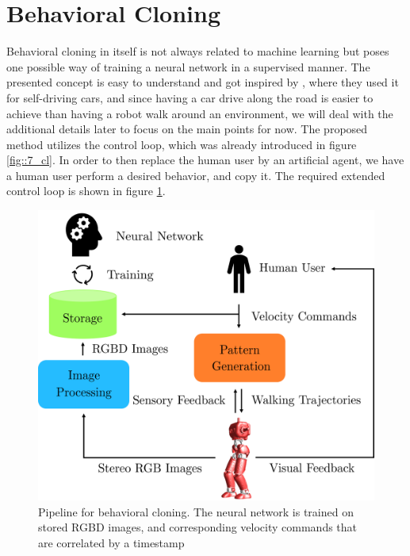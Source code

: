 
\FloatBarrier
\section{Behavioral Cloning}
\label{sec::71_bc}
Behavioral cloning in itself is not always related to machine learning but poses one possible way of training a neural network in a supervised manner. The presented concept is easy to understand and got inspired by \cite{bojarski2016end}, where they used it for self-driving cars, and since having a car drive along the road is easier to achieve than having a robot walk around an environment, we will deal with the additional details later to focus on the main points for now. The proposed method utilizes the control loop, which was already introduced in figure \ref{fig::7_cl}. In order to then replace the human user by an artificial agent, we have a human user perform a desired behavior, and copy it. The required extended control loop is shown in figure \ref{fig::71_bc}.
\begin{figure}[h!]
	\centering
	\includegraphics[scale=.5]{chapters/07_autonomous_high_level_control_of_the_walking_pattern_generator/img/behavioral_cloning.png}
	\caption{Pipeline for behavioral cloning. The neural network is trained on stored RGBD images, and corresponding velocity commands that are correlated by a timestamp}
	\label{fig::71_bc}
\end{figure}
